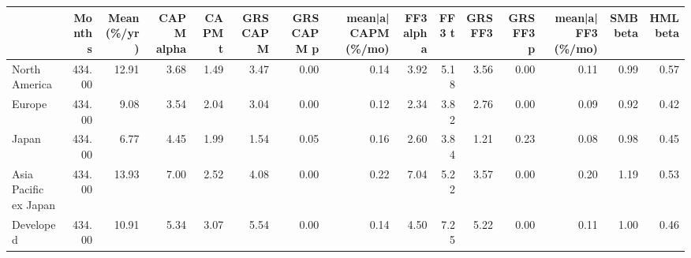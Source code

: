 \begin{tabular}{lrrrrrrrrrrrrrr}
\toprule
 & Months & Mean (\%/yr) & CAPM alpha & CAPM t & GRS CAPM & GRS CAPM p & mean|a| CAPM (\%/mo) & FF3 alpha & FF3 t & GRS FF3 & GRS FF3 p & mean|a| FF3 (\%/mo) & SMB beta & HML beta \\
\midrule
North America & 434.00 & 12.91 & 3.68 & 1.49 & 3.47 & 0.00 & 0.14 & 3.92 & 5.18 & 3.56 & 0.00 & 0.11 & 0.99 & 0.57 \\
Europe & 434.00 & 9.08 & 3.54 & 2.04 & 3.04 & 0.00 & 0.12 & 2.34 & 3.82 & 2.76 & 0.00 & 0.09 & 0.92 & 0.42 \\
Japan & 434.00 & 6.77 & 4.45 & 1.99 & 1.54 & 0.05 & 0.16 & 2.60 & 3.84 & 1.21 & 0.23 & 0.08 & 0.98 & 0.45 \\
Asia Pacific ex Japan & 434.00 & 13.93 & 7.00 & 2.52 & 4.08 & 0.00 & 0.22 & 7.04 & 5.22 & 3.57 & 0.00 & 0.20 & 1.19 & 0.53 \\
Developed & 434.00 & 10.91 & 5.34 & 3.07 & 5.54 & 0.00 & 0.14 & 4.50 & 7.25 & 5.22 & 0.00 & 0.11 & 1.00 & 0.46 \\
\bottomrule
\end{tabular}
